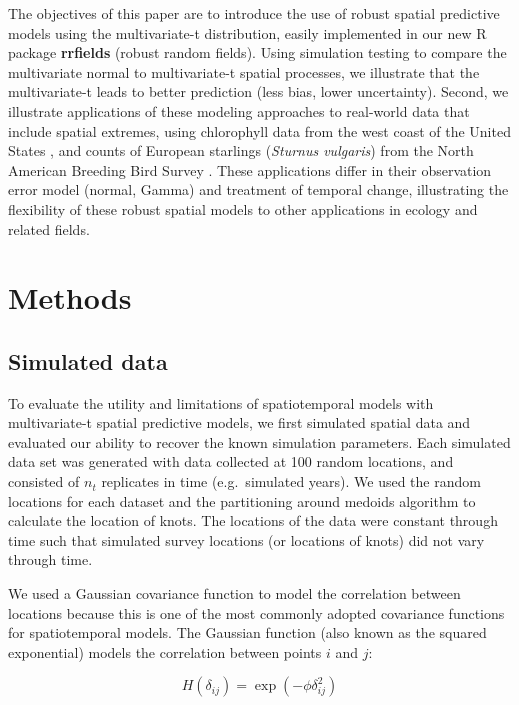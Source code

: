\documentclass[12pt,english]{article}
\begin{document}
\begin{spacing}{1.05}
The objectives of this paper are to introduce the use of robust spatial
predictive models using the multivariate-t distribution, easily implemented in
our new R package \textbf{rrfields} (robust random fields). Using simulation
testing to compare the multivariate normal to multivariate-t spatial processes,
we illustrate that the multivariate-t leads to better prediction (less bias,
lower uncertainty). Second, we illustrate applications of these modeling
approaches to real-world data that include spatial extremes, using chlorophyll
data from the west coast of the United States \citep{mckibben2012}, and counts
of European starlings (\emph{Sturnus vulgaris}) from the North American
Breeding Bird Survey \citep{pardieck2016}. These applications differ in their
observation error model (normal, Gamma) and treatment of temporal change,
illustrating the flexibility of these robust spatial models to other
applications in ecology and related fields.

\section{Methods}

\subsection{Simulated data}

To evaluate the utility and limitations of spatiotemporal models with
multivariate-t spatial predictive models, we first simulated spatial data and
evaluated our ability to recover the known simulation parameters. Each
simulated data set was generated with data collected at 
100 random locations, and consisted of
$n_t$ replicates in time (e.g.~simulated years). 
We used the random locations for each dataset 
and the partitioning around medoids algorithm
\citep[\texttt{pam()} in the R package \textbf{cluster};][]{reynolds2006}
to calculate the location of knots. The locations of the data were constant
through time such that simulated survey locations (or locations of knots) did
not vary through time.

We used a Gaussian covariance function to model the correlation between
locations because this is one of the most commonly adopted covariance functions
for spatiotemporal models. The Gaussian function (also known as the squared
exponential) models the correlation between points $i$ and $j$:

\begin{equation}
H(\delta_{ij}) = \exp \left(-\phi \delta_{ij}^2 \right)
\end{equation}


\end{spacing}
\end{document}
